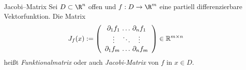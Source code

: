 \begin{definition}{Jacobi--Matrix}
    Sei $D \subset \R^n$ offen und $f : D \to \R^m$ eine partiell differenzierbare Vektorfunktion. Die Matrix
    $$
        J_f(x) := \left( 
            \begin{array}{c c} 
                \partial_1 f_1 \, \dots \, \partial_n f_1 \\ 
                \vdots \quad \ddots \quad \vdots \\ 
                \partial_1 f_m \, \dots \, \partial_n f_m 
            \end{array} \right) \in \mathbb{R}^{m \times n}
    $$
    heißt \emph{Funktionalmatrix} oder auch \emph{Jacobi-Matrix} von $f$ in $x \in D$.
\end{definition}